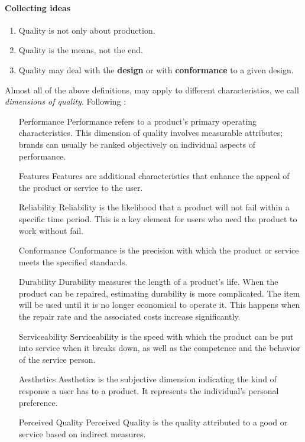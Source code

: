 \documentclass[12pt,a4paper]{report}
\begin{document}
\begin{tcolorbox}[breakable]
\paragraph{Collecting ideas}
\begin{enumerate}
\item Quality is not only about production. 
\item Quality is the means, not the end.
\item Quality may deal with the \textbf{design} or with \textbf{conformance} to a given design. 
\end{enumerate}
\end{tcolorbox}


Almost all of the above definitions, may apply to different characteristics, we call \emph{dimensions of quality}. Following \cite{wikipedia_eight_2015} :
\begin{enumerate}
\item [Performance] Performance refers to a product's primary operating characteristics. This dimension of quality involves measurable attributes; brands can usually be ranked objectively on individual aspects of performance.
\item [{Features}] Features are additional characteristics that enhance the appeal of the product or service to the user.
\item [{Reliability}] Reliability is the likelihood that a product will not fail within a specific time period. This is a key element for users who need the product to work without fail.
\item [{Conformance}] Conformance is the precision with which the product or service meets the specified standards.
\item [{Durability}] Durability measures the length of a product’s life. When the product can be repaired, estimating durability is more complicated. The item will be used until it is no longer economical to operate it. This happens when the repair rate and the associated costs increase significantly.
\item [{Serviceability}] Serviceability is the speed with which the product can be put into service when it breaks down, as well as the competence and the behavior of the service person.
\item [{Aesthetics}] Aesthetics is the subjective dimension indicating the kind of response a user has to a product. It represents the individual’s personal preference.
\item [{Perceived Quality}] Perceived Quality is the quality attributed to a good or service based on indirect measures.
\end{enumerate}
\end{document}
